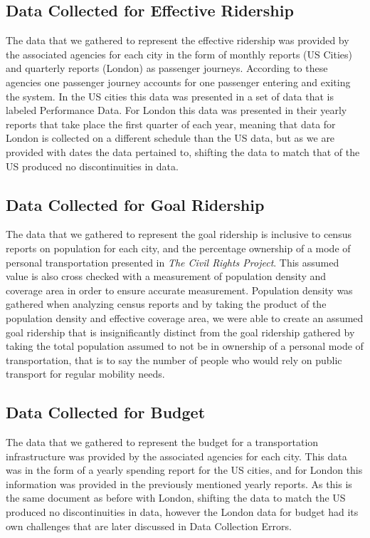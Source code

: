 \documentclass[12pt]{article}
\begin{document}
\begin{multicols}{2}
\subsection{Data Collected for Effective Ridership}
The data that we gathered to represent the effective ridership was provided by the associated agencies for each city in the form of monthly reports (US Cities) and quarterly reports (London) as passenger journeys. According to these agencies one passenger journey accounts for one passenger entering and exiting the system. In the US cities this data was presented in a set of data that is labeled Performance Data. For London this data was presented in their yearly reports that take place the first quarter of each year, meaning that data for London is collected on a different schedule than the US data, but as we are provided with dates the data pertained to, shifting the data to match that of the US produced no discontinuities in data.

\subsection{Data Collected for Goal Ridership}
The data that we gathered to represent the goal ridership is inclusive to census reports on population for each city, and the percentage ownership of a mode of personal transportation presented in \textit{The Civil Rights Project}. This assumed value is also cross checked with a measurement of population density and coverage area in order to ensure accurate measurement. Population density was gathered when analyzing census reports and by taking the product of the population density and effective coverage area, we were able to create an assumed goal ridership that is insignificantly distinct from the goal ridership gathered by taking the total population assumed to not be in ownership of a personal mode of transportation, that is to say the number of people who would rely on public transport for regular mobility needs.

\subsection{Data Collected for Budget}
The data that we gathered to represent the budget for a transportation infrastructure was provided by the associated agencies for each city. This data was in the form of a yearly spending report for the US cities, and for London this information was provided in the previously mentioned yearly reports. As this is the same document as before with London, shifting the data to match the US produced no discontinuities in data, however the London data for budget had its own challenges that are later discussed in Data Collection Errors.


\end{multicols}
\end{document}
